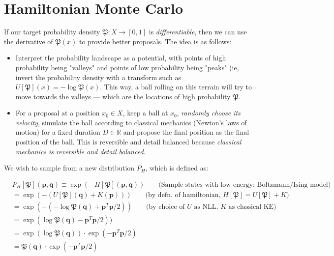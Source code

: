 \documentclass[titlepage]{article}
\newcommand{\R}{\mathbb{R}}
\newcommand{\p}{\mathbf{p}}
\newcommand{\q}{\mathbf{q}}
\renewcommand{\P}{\mathfrak{P}}
\begin{document}
\section{Hamiltonian Monte Carlo}

If our target probability density $\P: X \rightarrow [0, 1]$ is \emph{differentiable},
then we can use the derivative of $\P(x)$ to provide better proposals. The idea
is as follows:

\begin{itemize}
    \item Interpret the probability landscape as a potential, with
        points of high probability being "valleys" and points of low probability
        being "peaks" (ie, invert the probability density with a transform
        such as $U[\P](x) = -\log \P(x)$. This way, a ball rolling on this
        terrain will try to move towards the valleys --- which are the locations
        of high probability $\P$.
    \item For a proposal at a position $x_0 \in X$, keep a ball at $x_0$,
        \emph{randomly choose its velocity}, simulate the ball according to 
        classical mechanics (Newton's laws of motion) for a fixed duration $D \in \R$
        and propose the final position as the final position of the ball. This
        is reversible and detail balanced because 
        \emph{classical mechanics is reversible and detail balanced}.
\end{itemize}


We wish to sample from a new distribution $P_H$, which is defined as:

\begin{align*}
&P_H[\P](\p, \q) \equiv \exp(-H[\P](\p, \q)) \qquad \text{(Sample states with low energy: Boltzmann/Ising model)}\\
&= \exp(-(U[\P](\q) + K(\p))) \qquad \text{(by defn. of hamiltonian, $H[\P] = U[\P] + K$)}\\
&= \exp(-(-\log \P(\q) + \p^T \p/2)) \qquad \text{(by choice of $U$ as NLL, $K$ as classical KE)}\\
&= \exp(\log \P(\q) - \p^T \p/2)) \\
&= \exp(\log \P(\q)) \cdot \exp(-\p^T \p/2) \\
&= \P(\q) \cdot \exp(-\p^T \p/2) \\
\end{align*}
\end{document}
